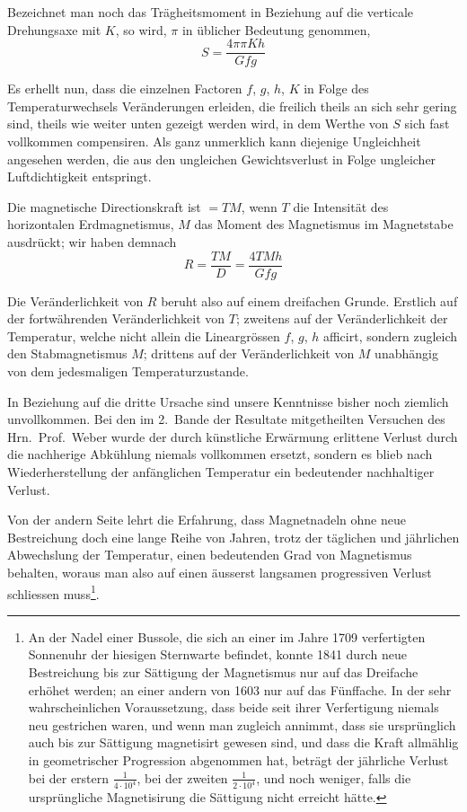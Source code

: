 \documentclass[12pt,a4paper]{article}
\begin{document}
Bezeichnet man noch das Trägheitsmoment in Beziehung auf die verticale Drehungsaxe mit $K$, so wird, $\pi$ in üblicher Bedeutung genommen,
\begin{equation}
S = \frac{4\pi\pi Kh}{Gfg}
\end{equation}

Es erhellt nun, dass die einzelnen Factoren $f$, $g$, $h$, $K$ in Folge des Temperaturwechsels Veränderungen erleiden, die freilich theils an sich sehr gering sind, theils wie weiter unten gezeigt werden wird, in dem Werthe von $S$ sich fast vollkommen compensiren. Als ganz unmerklich kann diejenige Ungleichheit angesehen werden, die aus den ungleichen Gewichtsverlust in Folge ungleicher Luftdichtigkeit entspringt.

Die magnetische Directionskraft ist $= TM$, wenn $T$ die Intensität des horizontalen Erdmagnetismus, $M$ das Moment des Magnetismus im Magnetstabe ausdrückt; wir haben demnach
\begin{equation}
R = \frac{TM}{D} = \frac{4TMh}{Gfg}
\end{equation}

Die Veränderlichkeit von $R$ beruht also auf einem dreifachen Grunde. Erstlich auf der fortwährenden Veränderlichkeit von $T$; zweitens auf der Veränderlichkeit der Temperatur, welche nicht allein die Lineargrössen $f$, $g$, $h$ afficirt, sondern zugleich den Stabmagnetismus $M$; drittens auf der Veränderlichkeit von $M$ unabhängig von dem jedesmaligen Temperaturzustande.

In Beziehung auf die dritte Ursache sind unsere Kenntnisse bisher noch ziemlich unvollkommen. Bei den im 2.~Bande der Resultate mitgetheilten Versuchen des Hrn.~Prof.~Weber wurde der durch künstliche Erwärmung erlittene Verlust durch die nachherige Abkühlung niemals vollkommen ersetzt, sondern es blieb nach Wiederherstellung der anfänglichen Temperatur ein bedeutender nachhaltiger Verlust.

Von der andern Seite lehrt die Erfahrung, dass Magnetnadeln ohne neue Bestreichung doch eine lange Reihe von Jahren, trotz der täglichen und jährlichen Abwechslung der Temperatur, einen bedeutenden Grad von Magnetismus behalten, woraus man also auf einen äusserst langsamen progressiven Verlust schliessen muss\footnote{An der Nadel einer Bussole, die sich an einer im Jahre 1709 verfertigten Sonnenuhr der hiesigen Sternwarte befindet, konnte 1841 durch neue Bestreichung bis zur Sättigung der Magnetismus nur auf das Dreifache erhöhet werden; an einer andern von 1603 nur auf das Fünffache. In der sehr wahrscheinlichen Voraussetzung, dass beide seit ihrer Verfertigung niemals neu gestrichen waren, und wenn man zugleich annimmt, dass sie ursprünglich auch bis zur Sättigung magnetisirt gewesen sind, und dass die Kraft allmählig in geometrischer Progression abgenommen hat, beträgt der jährliche Verlust bei der erstern $\tfrac{1}{4\cdot 10^{4}}$, bei der zweiten $\tfrac{1}{2\cdot 10^{4}}$, und noch weniger, falls die ursprüngliche Magnetisirung die Sättigung nicht erreicht hätte.}.
\end{document}
